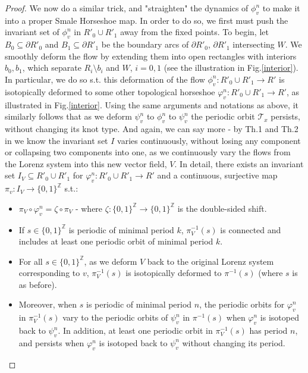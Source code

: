 \documentclass[10pt,reqno]{amsart}
\theoremstyle{plain}
\theoremstyle{assumption}
\theoremstyle{notation}
\theoremstyle{claim}
\theoremstyle{conj}
\theoremstyle{theorem}
\theoremstyle{proposition}
\theoremstyle{corollary}
\begin{document}
\begin{proof}
We now do a similar trick, and "straighten" the dynamics of $\phi^n_v$ to make it into a proper Smale Horseshoe map. In order to do so, we first must push the invariant set of $\phi^n_v$ in $R'_0\cup R'_1$ away from the fixed points. To begin, let $B_0\subseteq \partial R'_0$ and $B_1\subseteq \partial R'_1$ be the boundary arcs of $\partial R'_0$, $\partial R'_1$ intersecting $W$. We smoothly deform the flow by extending them into open rectangles with interiors $b_0,b_1$, which separate $R_i\setminus b_i$ and $W$, $i=0,1$ (see the illustration in Fig.\ref{interior}). In particular, we do so s.t. this deformation of the flow $\phi^n_v:R'_0\cup R'_1\to R'$ is isotopically deformed to some other topological horseshoe $\varphi^n_v:R'_0\cup R'_1\to R'$, as illustrated in Fig.\ref{interior}. Using the same arguments and notations as above, it similarly follows that as we deform $\psi^n_v$ to $\phi^n_v$ to $\psi^n_v$ the periodic orbit $\mathcal{T}_x$ persists, without changing its knot type. And again, we can say more - by Th.1 and Th.2 in \cite{Han} we know the invariant set $I$ varies continuously, without losing any component or collapsing two components into one, as we continuously vary the flows from the Lorenz system into this new vector field, $V$. In detail, there exists an invariant set $I_V\subseteq R'_0\cup R'_1$ for $\varphi^n_v:R'_0\cup R'_1\to R'$ and a continuous, surjective map $\pi_v:I_V\to\{0,1\}^\mathbb{Z}$ s.t.:

\begin{itemize}
    \item $\pi_V\circ\varphi^n_v=\zeta\circ\pi_V$ - where $\zeta:\{0,1\}^\mathbb{Z}\to\{0,1\}^\mathbb{Z}$ is the double-sided shift.
    \item If $s\in\{0,1\}^\mathbb{Z}$ is periodic of minimal period $k$, $\pi^{-1}_V(s)$ is connected and includes at least one periodic orbit of minimal period $k$.
    \item For all $s\in\{0,1\}^\mathbb{Z}$, as we deform $V$ back to the original Lorenz system corresponding to $v$, $\pi^{-1}_V(s)$ is isotopically deformed to $\pi^{-1}(s)$ (where $s$ is as before). 
    \item Moreover, when $s$ is periodic of minimal period $n$, the periodic orbits for $\varphi^n_v$ in $\pi_V^{-1}(s)$ vary to the periodic orbits of $\psi_v^n$ in $\pi^{-1}(s)$ when $\varphi^n_v$ is isotoped back to $\psi^n_v$. In addition, at least one periodic orbit in $\pi^{-1}_V(s)$ has period $n$, and persists when $\varphi^n_v$ is isotoped back to $\psi^n_v$ without changing its period.
\end{itemize}


\end{proof}
\end{document}
